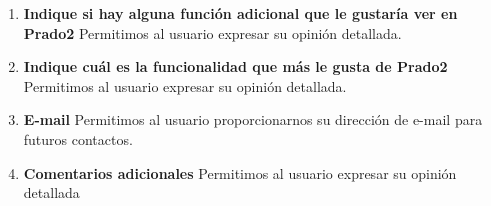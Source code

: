 \begin{enumerate}


  \item \textbf{Indique si hay alguna función adicional que le gustaría ver en Prado2} Permitimos al usuario expresar su opinión detallada.


  \item \textbf{Indique cuál es la funcionalidad que más le gusta de Prado2} Permitimos al usuario expresar su opinión detallada.


  \item \textbf{E-mail} Permitimos al usuario proporcionarnos su dirección de e-mail para futuros contactos.


  \item \textbf{Comentarios adicionales} Permitimos al usuario expresar su opinión detallada
  

\end{enumerate}

